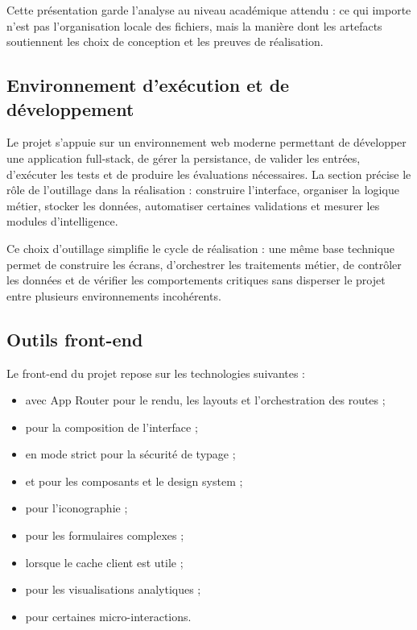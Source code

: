 Cette présentation garde l'analyse au niveau académique attendu : ce qui importe n'est pas l'organisation locale des fichiers, mais la manière dont les artefacts soutiennent les choix de conception et les preuves de réalisation.

\subsection{Environnement d'exécution et de développement}
Le projet s'appuie sur un environnement web moderne permettant de développer une application full-stack, de gérer la persistance, de valider les entrées, d'exécuter les tests et de produire les évaluations nécessaires. La section précise le rôle de l'outillage dans la réalisation : construire l'interface, organiser la logique métier, stocker les données, automatiser certaines validations et mesurer les modules d'intelligence.

Ce choix d'outillage simplifie le cycle de réalisation : une même base technique permet de construire les écrans, d'orchestrer les traitements métier, de contrôler les données et de vérifier les comportements critiques sans disperser le projet entre plusieurs environnements incohérents.

\subsection{Outils front-end}
Le front-end du projet repose sur les technologies suivantes :
\begin{itemize}
  \item {} avec App Router pour le rendu, les layouts et l'orchestration des routes  ;
  \item {} pour la composition de l'interface  ;
  \item {} en mode strict pour la sécurité de typage  ;
  \item {} et  pour les composants et le design system  ;
  \item {} pour l'iconographie ;
  \item {} pour les formulaires complexes ;
  \item {} lorsque le cache client est utile ;
  \item {} pour les visualisations analytiques ;
  \item {} pour certaines micro-interactions.
\end{itemize}

